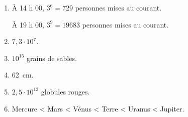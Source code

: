 \begin{solution}
  \begin{enumerate}


    \item À 14 h 00, $3^6=729$ personnes mises au courant.\par
          À 19 h 00, $3^9=\num{19 683}$ personnes mises au courant.
    \item $7,3\cdot 10^7$.
    \item $10^{15}$ grains de sables.
    \item \SI{62}{cm}.
    \item $2,5\cdot 10^{13}$ globules rouges.
    \item Mercure < Mars < Vénus < Terre < Uranus < Jupiter.
  \end{enumerate}
\end{solution}


